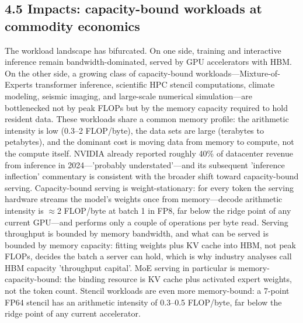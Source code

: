 \documentclass[12pt,onecolumn]{article}
\begin{document}
\subsection*{4.5 Impacts: capacity-bound workloads at commodity economics}\label{sec:4.5}

The workload landscape has bifurcated. On one side, training and interactive inference remain bandwidth-dominated, served by GPU accelerators with HBM. On the other side, a growing class of capacity-bound workloads---Mixture-of-Experts transformer inference, scientific HPC stencil computations, climate modeling, seismic imaging, and large-scale numerical simulation---are bottlenecked not by peak FLOPs but by the memory capacity required to hold resident data\cite{21,22,23,26}. These workloads share a common memory profile: the arithmetic intensity is low (0.3--2 FLOP/byte), the data sets are large (terabytes to petabytes), and the dominant cost is moving data from memory to compute, not the compute itself\cite{5}. NVIDIA already reported roughly 40\% of datacenter revenue from inference in 2024---'probably understated'---and its subsequent 'inference inflection' commentary is consistent with the broader shift toward capacity-bound serving\cite{2}. Capacity-bound serving is weight-stationary: for every token the serving hardware streams the model's weights once from memory---decode arithmetic intensity is $\approx$2 FLOP/byte at batch 1 in FP8, far below the ridge point of any current GPU---and performs only a couple of operations per byte read\cite{24,26}. Serving throughput is bounded by memory bandwidth, and what can be served is bounded by memory capacity: fitting weights plus KV cache into HBM, not peak FLOPs, decides the batch a server can hold, which is why industry analyses call HBM capacity 'throughput capital'\cite{26}. MoE serving in particular is memory-capacity-bound: the binding resource is KV cache plus activated expert weights, not the token count\cite{27}. Stencil workloads are even more memory-bound: a 7-point FP64 stencil has an arithmetic intensity of 0.3--0.5 FLOP/byte, far below the ridge point of any current accelerator\cite{5}.
\end{document}
